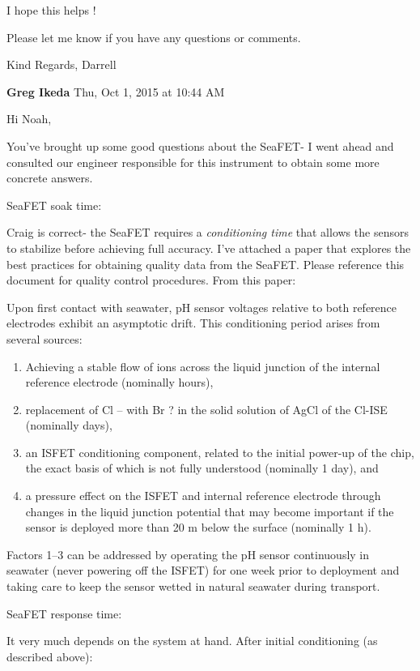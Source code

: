 \documentclass[]{book}
\begin{document}
I hope this helps !

Please let me know if you have any questions or comments.

Kind Regards,
Darrell

\textbf{Greg Ikeda} Thu, Oct 1, 2015 at 10:44 AM

Hi Noah,

You've brought up some good questions about the SeaFET- I went ahead and consulted our engineer responsible for this instrument to obtain some more concrete answers.

SeaFET soak time:

Craig is correct- the SeaFET requires a \emph{conditioning time} that allows the sensors to stabilize before achieving full accuracy. I've attached a paper that explores the best practices for obtaining quality data from the SeaFET. Please reference this document for quality control procedures. From this paper:

Upon first contact with seawater, pH sensor voltages relative to both reference electrodes exhibit an asymptotic
drift. This conditioning period arises from several sources:

\begin{enumerate}
\def\labelenumi{\arabic{enumi})}
\item
  Achieving a stable flow of ions across the liquid junction of the internal reference electrode (nominally hours),
\item
  replacement of Cl -- with Br ? in the solid solution of AgCl of the Cl-ISE (nominally days),
\item
  an ISFET conditioning component, related to the initial power-up of the chip, the exact basis of which is not fully understood (nominally 1 day), and
\item
  a pressure effect on the ISFET and internal reference electrode through changes in the liquid junction potential that may become important if the sensor is deployed more than 20 m below the surface (nominally 1 h).
\end{enumerate}

Factors 1--3 can be addressed by operating the pH sensor continuously in seawater (never powering off the ISFET) for one week prior to deployment and taking care to keep the sensor wetted in natural seawater during transport.

SeaFET response time:

It very much depends on the system at hand. After initial conditioning (as described above):
\end{document}
